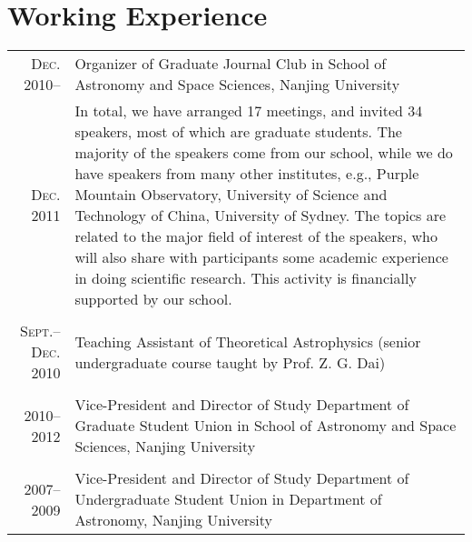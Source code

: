\documentclass[10pt]{article}
\begin{document}
\section{Working Experience}
\begin{tabular}{rp{16cm}}
\textsc{Dec. 2010}--  & Organizer of Graduate Journal Club in School of Astronomy and Space Sciences, Nanjing University \\
\textsc{Dec. 2011}    & \small{In total, we have arranged 17 meetings, and invited 34 speakers, most of which are graduate students. The majority of the speakers come from our school, while we do have speakers from many other institutes, e.g., Purple Mountain Observatory, University of Science and Technology of China, University of Sydney. The topics are related to the major field of interest of the speakers, who will also share with participants some academic experience in doing scientific research. This activity is financially supported by our school.}  \\
\multicolumn{2}{c}{} \\
\textsc{\small Sept.--Dec. 2010}  & Teaching Assistant of Theoretical Astrophysics (senior undergraduate course taught by Prof. Z. G. Dai) \\
\multicolumn{2}{c}{} \\
\textsc{2010--2012}  & Vice-President and Director of Study Department of Graduate Student Union in School of Astronomy and Space Sciences, Nanjing University\\
\multicolumn{2}{c}{} \\
\textsc{2007--2009}  & Vice-President and Director of Study Department of Undergraduate Student Union in Department of Astronomy, Nanjing University\\

\end{tabular}
\end{document}
